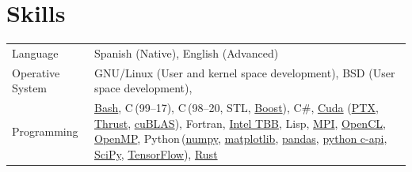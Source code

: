 \documentclass[a4paper,10pt]{article}
\def\CC{{C\nolinebreak[4]\hspace{-.05em}\raisebox{.2ex}{++}}}
\def\CS{{C\nolinebreak[4]\hspace{-.05em}\#}}
\begin{document}
\section{Skills}
\begin{tabularx}{\linewidth}{@{}l X@{}}
  Language & Spanish (Native), English (Advanced)\\
  Operative System & GNU/Linux (User and kernel space development), BSD (User space development), \\
  Programming & \href{https://www.gnu.org/software/bash/}{Bash},
                C\,(99--17), \CC\,(98--20, STL, \href{https://www.boost.org/}{Boost}),
                \CS,
                \href{https://developer.nvidia.com/cuda-zone}{Cuda}
                (\href{https://docs.nvidia.com/cuda/parallel-thread-execution/index.html}{PTX},
                \href{https://nvidia.github.io/cccl/thrust/}{Thrust},
                \href{https://developer.nvidia.com/cublas}{cuBLAS}),
                Fortran,
                \href{https://www.intel.com/content/www/us/en/developer/tools/oneapi/onetbb.html}{Intel TBB},
                Lisp,
                \href{https://www.mpi-forum.org/}{MPI},
                \href{https://www.khronos.org/api/opencl}{OpenCL},
                \href{https://www.openmp.org/}{OpenMP},
                Python\,(\href{https://numpy.org/}{numpy},
                \href{https://matplotlib.org/}{matplotlib},
                \href{https://pandas.pydata.org/}{pandas},
                \href{https://docs.python.org/3/c-api/index.html}{python c-api},
                \href{https://scipy.org/}{SciPy}, \href{https://www.tensorflow.org/}{TensorFlow}),
                \href{https://www.rust-lang.org/}{Rust} \\



\end{tabularx}
\end{document}

